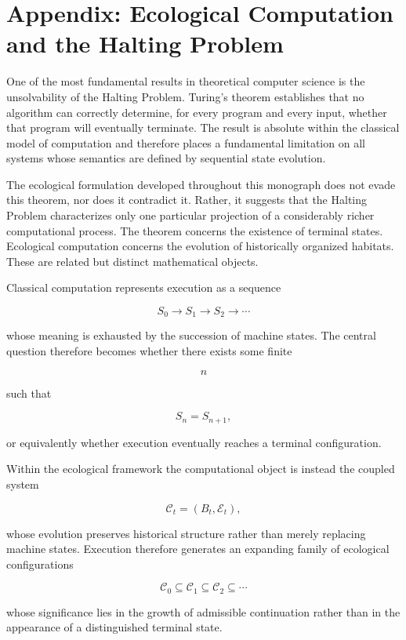\documentclass[12pt,oneside]{article}
\theoremstyle{remark}
\begin{document}
\section{Appendix: Ecological Computation and the Halting Problem}

One of the most fundamental results in theoretical computer science is the
unsolvability of the Halting Problem. Turing's theorem establishes that no
algorithm can correctly determine, for every program and every input, whether
that program will eventually terminate. The result is absolute within the
classical model of computation and therefore places a fundamental limitation on
all systems whose semantics are defined by sequential state evolution.

The ecological formulation developed throughout this monograph does not evade
this theorem, nor does it contradict it. Rather, it suggests that the Halting
Problem characterizes only one particular projection of a considerably richer
computational process. The theorem concerns the existence of terminal states.
Ecological computation concerns the evolution of historically organized
habitats. These are related but distinct mathematical objects.

Classical computation represents execution as a sequence

\[
S_0
\rightarrow
S_1
\rightarrow
S_2
\rightarrow
\cdots
\]

whose meaning is exhausted by the succession of machine states. The central
question therefore becomes whether there exists some finite

\[
n
\]

such that

\[
S_n
=
S_{n+1},
\]

or equivalently whether execution eventually reaches a terminal
configuration.

Within the ecological framework the computational object is instead the coupled
system

\[
\mathcal C_t
=
(B_t,\mathcal E_t),
\]

whose evolution preserves historical structure rather than merely replacing
machine states. Execution therefore generates an expanding family of ecological
configurations

\[
\mathcal C_0
\subseteq
\mathcal C_1
\subseteq
\mathcal C_2
\subseteq
\cdots
\]

whose significance lies in the growth of admissible continuation rather than in
the appearance of a distinguished terminal state.
\end{document}
